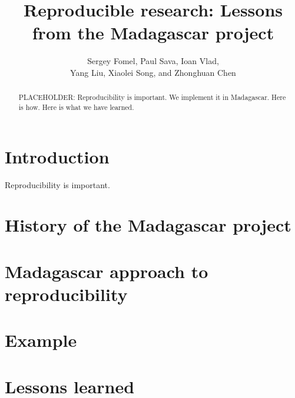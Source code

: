 \title{Reproducible research: Lessons from the Madagascar project}


\author{
Sergey Fomel\footnotemark[1],
Paul Sava\footnotemark[2],
Ioan Vlad\footnotemark[3], \\
Yang Liu\footnotemark[4],
Xiaolei Song\footnotemark[1], and
Zhonghuan Chen\footnotemark[5]
}

\address{
\footnotemark[1]Bureau of Economic Geology \\
Jackson School of Geosciences \\
The University of Texas at Austin \\
University Station, Box X \\
Austin, TX 78713-8972 \\
USA \\
\footnotemark[2] Department of Geophysics \\
Colorado School of Mines \\
Golden, CO 804 \\
USA
}

\begin{abstract}
PLACEHOLDER: Reproducibility is important. We implement it in Madagascar. Here is how. Here is what we have learned.
\end{abstract}

\section{Introduction}

Reproducibility is important.

\section{History of the Madagascar project}

\section{Madagascar approach to reproducibility}

\section{Example}

\section{Lessons learned}


